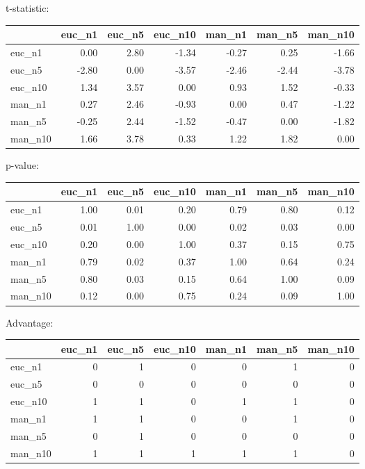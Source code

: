 t-statistic:
 \begin{tabular}{lrrrrrr}
\hline
         &   euc\_n1 &   euc\_n5 &   euc\_n10 &   man\_n1 &   man\_n5 &   man\_n10 \\
\hline
 euc\_n1  &     0.00 &     2.80 &     -1.34 &    -0.27 &     0.25 &     -1.66 \\
 euc\_n5  &    -2.80 &     0.00 &     -3.57 &    -2.46 &    -2.44 &     -3.78 \\
 euc\_n10 &     1.34 &     3.57 &      0.00 &     0.93 &     1.52 &     -0.33 \\
 man\_n1  &     0.27 &     2.46 &     -0.93 &     0.00 &     0.47 &     -1.22 \\
 man\_n5  &    -0.25 &     2.44 &     -1.52 &    -0.47 &     0.00 &     -1.82 \\
 man\_n10 &     1.66 &     3.78 &      0.33 &     1.22 &     1.82 &      0.00 \\
\hline
\end{tabular} 

p-value:
 \begin{tabular}{lrrrrrr}
\hline
         &   euc\_n1 &   euc\_n5 &   euc\_n10 &   man\_n1 &   man\_n5 &   man\_n10 \\
\hline
 euc\_n1  &     1.00 &     0.01 &      0.20 &     0.79 &     0.80 &      0.12 \\
 euc\_n5  &     0.01 &     1.00 &      0.00 &     0.02 &     0.03 &      0.00 \\
 euc\_n10 &     0.20 &     0.00 &      1.00 &     0.37 &     0.15 &      0.75 \\
 man\_n1  &     0.79 &     0.02 &      0.37 &     1.00 &     0.64 &      0.24 \\
 man\_n5  &     0.80 &     0.03 &      0.15 &     0.64 &     1.00 &      0.09 \\
 man\_n10 &     0.12 &     0.00 &      0.75 &     0.24 &     0.09 &      1.00 \\
\hline
\end{tabular} 

Advantage:
 \begin{tabular}{lrrrrrr}
\hline
         &   euc\_n1 &   euc\_n5 &   euc\_n10 &   man\_n1 &   man\_n5 &   man\_n10 \\
\hline
 euc\_n1  &        0 &        1 &         0 &        0 &        1 &         0 \\
 euc\_n5  &        0 &        0 &         0 &        0 &        0 &         0 \\
 euc\_n10 &        1 &        1 &         0 &        1 &        1 &         0 \\
 man\_n1  &        1 &        1 &         0 &        0 &        1 &         0 \\
 man\_n5  &        0 &        1 &         0 &        0 &        0 &         0 \\
 man\_n10 &        1 &        1 &         1 &        1 &        1 &         0 \\
\hline
\end{tabular} 

